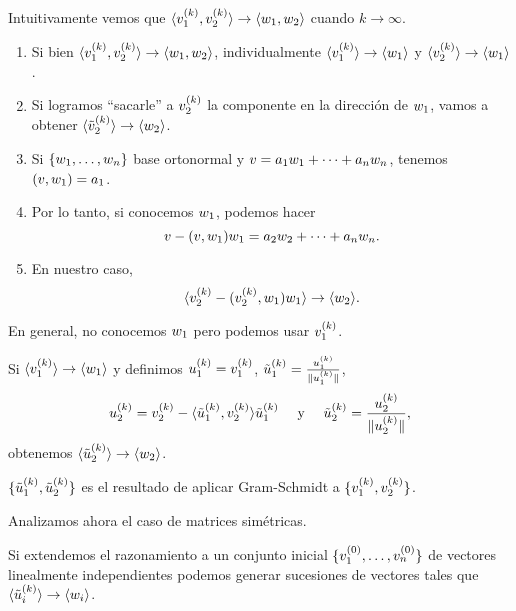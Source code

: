 Intuitivamente vemos que $\langle \vb_1^{(k)}, \vb_2^{(k)} \rangle \rightarrow \langle \wb_1, \wb_2 \rangle$ cuando $k \rightarrow \infty$.

\begin{enumerate}
\item Si bien $\langle \vb_1^{(k)}, \vb_2^{(k)} \rangle \rightarrow \langle \wb_1, \wb_2 \rangle$, individualmente  $\langle \vb_1^{(k)} \rangle \rightarrow \langle \wb_1 \rangle$ y  $\langle \vb_2^{(k)} \rangle \rightarrow \langle \wb_1\rangle $.

\item Si logramos ``sacarle'' a $\vb_2^{(k)}$ la componente en la dirección de $\wb_1$, vamos a obtener $\langle \tilde \vb_2^{(k)} \rangle \rightarrow \langle \wb_2 \rangle $.

\item Si $\{\wb_1, \dots, \wb_n\}$ base ortonormal y $\vb = a_1 \wb_1 + \dots + a_n \wb_n$, tenemos $(\vb, \wb_1) = a_1$.

\item Por lo tanto, si conocemos $\wb_1$, podemos hacer
$$\vb - ( \vb , \wb_1 ) \wb_1 = a_2 \wb_2 + \dots + a_n \wb_n.$$

\item En nuestro caso,
$$\langle \vb_2^{(k)} - ( \vb_2^{(k)} , \wb_1 ) \wb_1 \rangle \rightarrow \langle  \wb_2 \rangle.$$

\end{enumerate}

En general, no conocemos $\wb_1$ pero podemos usar $\vb_1^{(k)}$.

Si $\langle \vb_1^{(k)} \rangle \rightarrow \langle \wb_1 \rangle$ y definimos $\ub_1^{(k)} = \vb_1^{(k)}$, $\tilde \ub_1^{(k)} = \frac{\ub_1^{(k)}}{\|\ub_1^{(k)}\|}$,
$$
\ub_2^{(k)} =
\vb_2^{(k)} - \langle \tilde \ub_1^{(k)}, \vb_2^{(k)} \rangle \tilde \ub_1^{(k)} \quad \text{ y } \quad \tilde \ub_2^{(k)} = \frac{\ub_2^{(k)}}{\|\ub_2^{(k)}\|},
$$
obtenemos $\langle \tilde \ub_2^{(k)} \rangle \rightarrow \langle \wb_2 \rangle$.

\begin{remark} $\{\tilde \ub_1^{(k)}, \tilde \ub_2^{(k)} \}$ es el resultado de aplicar Gram-Schmidt a $\{\vb_1^{(k)}, \vb_2^{(k)} \}$.
\end{remark}

Analizamos ahora el caso de matrices simétricas.

Si extendemos el razonamiento a un conjunto inicial $\{\vb_1^{(0)}, \dots, \vb_n^{(0)} \}$ de vectores linealmente independientes podemos generar sucesiones de vectores tales que $\langle \tilde \ub_i^{(k)} \rangle \rightarrow \langle \wb_i \rangle$.

